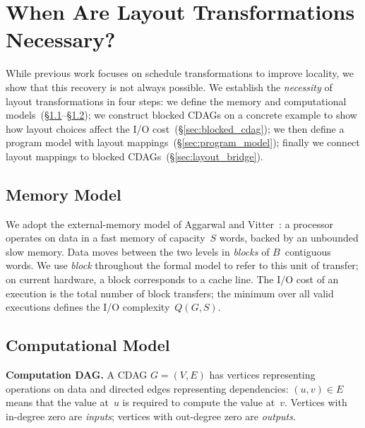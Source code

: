 \section{When Are Layout Transformations Necessary?}
\label{sec:necessity}

While previous work focuses on schedule transformations to improve locality, we show that this recovery is not always possible.  We establish the \textit{necessity} of layout transformations in four steps: we define the memory and computational models~(\S\ref{sec:memory_model}--\S\ref{sec:comp_model}); we construct blocked CDAGs on a concrete example to show how layout choices affect the I/O cost~(\S\ref{sec:blocked_cdag}); we then define a program model with layout mappings~(\S\ref{sec:program_model}); finally we connect layout mappings to blocked CDAGs~(\S\ref{sec:layout_bridge}).

\subsection{Memory Model}\label{sec:memory_model}

We adopt the external-memory model of Aggarwal and Vitter~\cite{IOComplexityModel}: a processor operates on data in a fast memory of capacity~$S$ words, backed by an unbounded slow memory.  Data moves between the two levels in \emph{blocks} of $B$~contiguous words.  We use \emph{block} throughout the formal model to refer to this unit of transfer; on current hardware, a block corresponds to a cache line.  The I/O cost of an execution is the total number of block transfers; the minimum over all valid executions defines the I/O complexity~$Q(G, S)$.

\subsection{Computational Model}\label{sec:comp_model}

\textbf{Computation DAG.}  A CDAG $G = (V, E)$ has vertices representing operations on data and directed edges representing dependencies: $(u, v) \in E$ means that the value at~$u$ is required to compute the value at~$v$.  Vertices with in-degree zero are \emph{inputs}; vertices with out-degree zero are \emph{outputs}.

